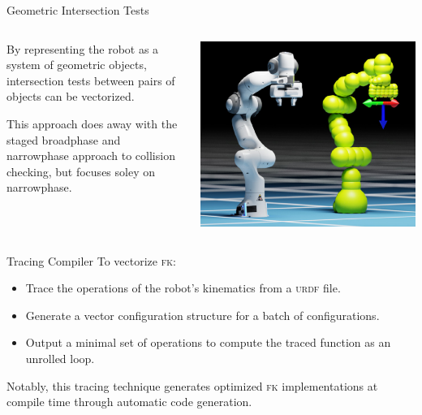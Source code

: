 \documentclass{beamer}
\begin{document}
\begin{frame}{Geometric Intersection Tests}
\begin{columns}
\begin{column}{0.5\textwidth}
By representing the robot as a system of geometric objects, intersection tests between pairs of objects can be vectorized.

\vspace{10px}

This approach does away with the staged broadphase and narrowphase approach to collision checking, but focuses soley on narrowphase.
\end{column}
\begin{column}{0.5\textwidth}
\includegraphics[width=\textwidth]{./assets/panda_spheres.png}
\end{column}
\end{columns}
\end{frame}

\begin{frame}{Tracing Compiler}
To vectorize \textsc{fk}:
\begin{itemize}
\item Trace the operations of the robot's kinematics from a \textsc{urdf} file.
\item Generate a vector configuration structure for a batch of configurations. 
\item Output a minimal set of operations to compute the traced function as an unrolled loop.
\end{itemize}

Notably, this tracing technique generates optimized \textsc{fk} implementations at compile time through automatic code generation.
\end{frame}
\end{document}
